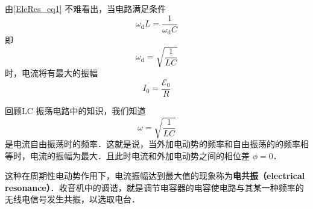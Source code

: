 由\autoref{EleRes_eq1} 不难看出，当电路满足条件 $$\omega_{\mathrm{d}} L=\dfrac{1}{\omega_{\mathrm{d}} C}$$ 
即
\begin{equation}
\omega_{\mathrm{d}}=\sqrt{\frac{1}{L C}}
\end{equation}
时，电流将有最大的振幅
$$I_0=\dfrac{\mathscr{E}_{0}}{R}$$

回顾LC 振荡电路中的知识，我们知道
$$\omega = \sqrt{\frac{1}{LC}}$$是电流自由振荡时的频率．这就是说，当外加电动势的频率和自由振荡的的频率相等时，电流的振幅为最大．且此时电流和外加电动势之间的相位差 $\phi=0$．

这种在周期性电动势作用下，电流振幅达到最大值的现象称为\textbf{电共振（electrical resonance）}．收音机中的调谐，就是调节电容器的电容使电路与其某一种频率的无线电信号发生共振，以选取电台．
